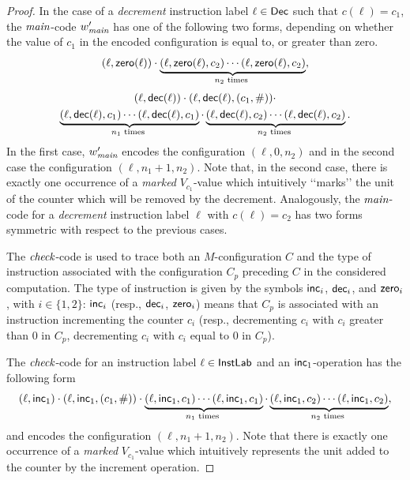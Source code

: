 \begin{proof}
In the case of a \emph{decrement} instruction label $\ell\in \mathsf{Dec}$  such that $c(\ell)=c_1$, the ${\textit{main}}$-code $w'_{\textit{main}}$ has one of the following two forms, depending on whether the value of $c_1$ in the encoded configuration is equal to, or greater than zero.
 \[
(\ell,{\mathsf{zero}}(\ell)) \cdot  \underbrace{(\ell,{\mathsf{zero}}(\ell),c_2)\cdots(\ell,{\mathsf{zero}}(\ell),c_2)}_{n_2 \text{ times }},
\]
%
\begin{multline*}
 (\ell,{\mathsf{dec}}(\ell)) \cdot (\ell,{\mathsf{dec}}(\ell),(c_1,\#))\cdot \\  \underbrace{(\ell,{\mathsf{dec}}(\ell), c_1)\cdots(\ell,{\mathsf{dec}}(\ell), c_1)}_{n_1 \text{ times }}
 \cdot \underbrace{(\ell,{\mathsf{dec}}(\ell), c_2)\cdots(\ell, {\mathsf{dec}}(\ell), c_2)}_{n_2 \text{ times }}.
\end{multline*}
%
In the first case, $w'_{\textit{main}}$ encodes the configuration $(\ell,0,n_2)$ and in the second case the configuration $(\ell,n_1+1,n_2)$. Note that, in the second case, there is exactly one occurrence of a \emph{marked} $V_{c_1}$-value which intuitively \lq\lq marks\rq\rq{} the unit of the counter which will be removed by the decrement. Analogously, the ${\textit{main}}$-code  for a  \emph{decrement} instruction label $\ell$ with $c(\ell)=c_2$ has two forms symmetric with respect to the previous cases.
%
%

The ${\textit{check}}$-code is used to trace both an $M$-configuration $C$ and the type of instruction associated with the configuration $C_p$ preceding $C$ in the considered computation. 
The type of instruction is given by the symbols ${\mathsf{inc}}_i$, ${\mathsf{dec}}_i$, and ${\mathsf{zero}}_i$, with $i\in\{1,2\}$: 
${\mathsf{inc}}_i$ (resp.,  ${\mathsf{dec}}_i$, ${\mathsf{zero}}_i$) means that $C_p$ is associated with an instruction incrementing the counter $c_i$
(resp., decrementing $c_i$ with $c_i$ greater than $0$ in $C_p$,  decrementing $c_i$ with $c_i$ equal to $0$ in $C_p$).

The ${\textit{check}}$-code  for an instruction label $\ell\in\mathsf{InstLab}$ and an ${\mathsf{inc}}_1$-operation has the following form
%
\[
 (\ell,{\mathsf{inc}}_1)  \cdot (\ell,{\mathsf{inc}}_1,(c_1,\#))\cdot \underbrace{(\ell,{\mathsf{inc}}_1,c_1)\cdots(\ell,{\mathsf{inc}}_1,c_1)}_{n_1 \text{ times }}
 \cdot 
 \underbrace{(\ell,{\mathsf{inc}}_1,c_2)\cdots(\ell,{\mathsf{inc}}_1,c_2)}_{n_2 \text{ times }},
\]
%
and encodes the configuration $(\ell,n_1+1,n_2)$. Note that there is exactly one occurrence of a \emph{marked} $V_{c_1}$-value which intuitively represents the unit added to the counter by the increment operation.


\end{proof}
